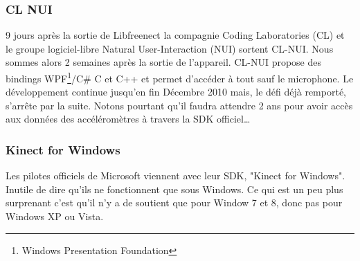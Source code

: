 \subsubsection{CL NUI}
9 jours après la sortie de Libfreenect la compagnie Coding Laboratories 
(CL) et le groupe logiciel-libre
Natural User-Interaction (NUI) sortent CL-NUI. Nous sommes alors 2 semaines 
après la sortie de l'appareil. CL-NUI propose des bindings 
WPF\footnote{Windows Presentation Foundation}/C\# C et C++ et permet d'accéder 
à tout sauf le microphone. Le développement continue jusqu'en fin Décembre 2010 
mais,
le défi déjà remporté, s'arrête par la suite. Notons pourtant qu'il faudra 
attendre 2 ans pour avoir accès aux données des accéléromètres à travers la 
SDK officiel\ldots
\subsubsection{Kinect for Windows}  
Les pilotes officiels de Microsoft viennent avec leur SDK, "Kinect for 
Windows". Inutile de dire
qu'ils ne fonctionnent que sous Windows. Ce qui est un peu plus surprenant 
c'est qu'il n'y a de soutient que pour Window 7 et 8, donc pas pour Windows XP 
ou Vista.
